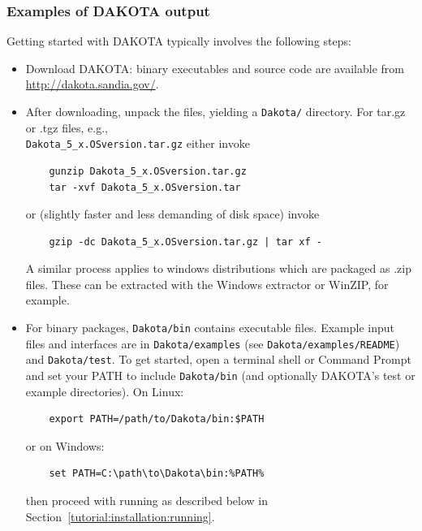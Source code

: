 \subsubsection {Examples of DAKOTA output}\label{tutorial:installation:quickstart:output}

Getting started with DAKOTA typically involves the following steps:
\begin{itemize}
  \item Download DAKOTA: binary executables and source code are
    available from\\
    \url{http://dakota.sandia.gov/}.

  \item After downloading, unpack the files, yielding a {\tt Dakota/}
    directory.  For tar.gz or .tgz files, e.g.,\\
    \texttt{Dakota\_5\_x.OSversion.tar.gz} either invoke
    \begin{small}
\begin{verbatim}
    gunzip Dakota_5_x.OSversion.tar.gz
    tar -xvf Dakota_5_x.OSversion.tar
\end{verbatim}
    \end{small}
    or (slightly faster and less demanding of disk space) invoke
    \begin{small}
\begin{verbatim}
    gzip -dc Dakota_5_x.OSversion.tar.gz | tar xf -
\end{verbatim}
    \end{small}
    A similar process applies to windows distributions which are
    packaged as .zip files.  These can be extracted with the Windows
    extractor or WinZIP, for example.

  \item For binary packages, {\tt Dakota/bin} contains executable
    files. Example input files and interfaces are in
    \texttt{Dakota/examples} (see \texttt{Dakota/examples/README}) and
    \texttt{Dakota/test}.  To get started, open a terminal shell or
    Command Prompt and set your PATH to include {\tt Dakota/bin} (and
    optionally DAKOTA's test or example directories).  On Linux:
    \begin{small}
\begin{verbatim}
    export PATH=/path/to/Dakota/bin:$PATH
\end{verbatim} %
    \end{small}
    or on Windows:
    \begin{small}
\begin{verbatim}
    set PATH=C:\path\to\Dakota\bin:%PATH%
\end{verbatim}
    \end{small}
    then proceed with running as described below in 
    Section~\ref{tutorial:installation:running}.


\end{itemize}
